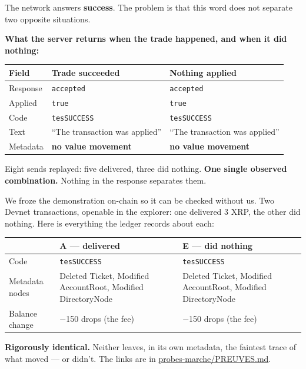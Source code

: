 \documentclass[10pt,a4paper]{article}
\newcommand{\tc}[1]{\texttt{\small #1}}
\begin{document}
The network answers \textbf{success}. The problem is that this word does not separate two opposite situations.

\textbf{What the server returns when the trade happened, and when it did nothing:}

\vspace{3pt}
\begin{tabularx}{\linewidth}{lXX}
\toprule
\textbf{Field} & \textbf{Trade succeeded} & \textbf{Nothing applied} \\
\midrule
Response & \tc{accepted} & \tc{accepted} \\
Applied & \tc{true} & \tc{true} \\
Code & \tc{tesSUCCESS} & \tc{tesSUCCESS} \\
Text & ``The transaction was applied'' & ``The transaction was applied'' \\
Metadata & \textbf{no value movement} & \textbf{no value movement} \\
\bottomrule
\end{tabularx}
\vspace{3pt}

Eight sends replayed: five delivered, three did nothing. \textbf{One single observed combination.} Nothing in the response separates them.

We froze the demonstration on-chain so it can be checked without us. Two Devnet transactions, openable in the explorer: one delivered 3 XRP, the other did nothing. Here is everything the ledger records about each:

\vspace{3pt}
\begin{tabularx}{\linewidth}{lXX}
\toprule
\textbf{} & \textbf{A --- delivered} & \textbf{E --- did nothing} \\
\midrule
Code & \tc{tesSUCCESS} & \tc{tesSUCCESS} \\
Metadata nodes & Deleted Ticket, Modified AccountRoot, Modified DirectoryNode & Deleted Ticket, Modified AccountRoot, Modified DirectoryNode \\
Balance change & $-$150 drops (the fee) & $-$150 drops (the fee) \\
\bottomrule
\end{tabularx}
\vspace{3pt}

\textbf{Rigorously identical.} Neither leaves, in its own metadata, the faintest trace of what moved --- or didn't. The links are in \href{./probes-marche/PREUVES.md}{probes-marche/PREUVES.md}.
\end{document}
